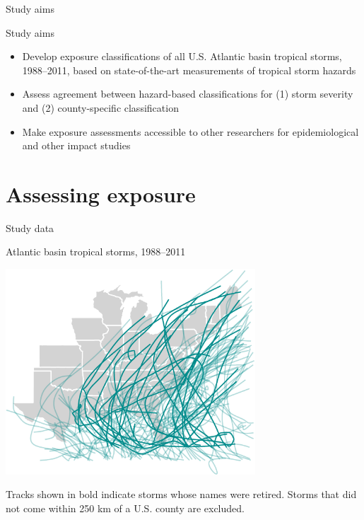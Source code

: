\documentclass[ignorenonframetext,]{beamer}
\begin{document}
\begin{frame}{Study aims}

\begin{block}{Study aims}
\begin{itemize}
  \item Develop exposure classifications of all U.S. Atlantic basin tropical storms, 1988--2011, based on state-of-the-art measurements of tropical storm hazards
  \item Assess agreement between hazard-based classifications for (1) storm severity and (2) county-specific classification
  \item Make exposure assessments accessible to other researchers for epidemiological and other impact studies 
\end{itemize}
\end{block}

\end{frame}

\section{Assessing exposure}\label{assessing-exposure-3}

\begin{frame}{Study data}

\vspace{-0.4cm}

\begin{center}
\large Atlantic basin tropical storms, 1988--2011
\end{center}

\vspace{-0.6cm}

\begin{center}\includegraphics[width=0.7\textwidth]{anderson_jan11_files/figure-beamer/unnamed-chunk-3-1} \end{center}

\vspace{-1cm}

\begin{center}
\footnotesize Tracks shown in bold indicate storms whose names were retired. Storms that did not come within 250 km of a U.S. county are excluded.
\end{center}

\end{frame}
\end{document}
